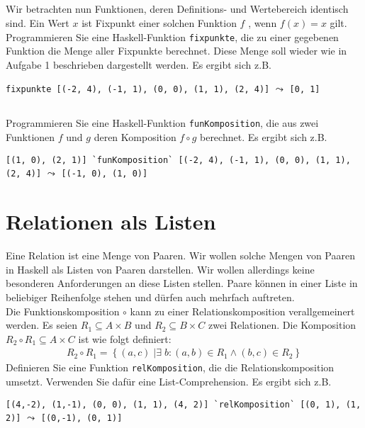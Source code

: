 \documentclass[
  10pt,                   %
  DIV12,
  german,                 %
  oneside,                %
  parskip=half,           %
  headings=normal,        %
  captions=tableheading,  %
]{scrartcl}
\begin{document}
\subsection{}
Wir betrachten nun Funktionen, deren Definitions- und Wertebereich identisch sind.
Ein Wert $x$ ist Fixpunkt einer solchen Funktion $f$ , wenn $f(x) = x$ gilt. Programmieren
Sie eine Haskell-Funktion \lstinline|fixpunkte|, die zu einer gegebenen Funktion die Menge
aller Fixpunkte berechnet. Diese Menge soll wieder wie in Aufgabe 1 beschrieben
dargestellt werden. Es ergibt sich z.B.
\begin{center}
\lstinline|fixpunkte [(-2, 4), (-1, 1), (0, 0), (1, 1), (2, 4)]| $\leadsto$ \lstinline|[0, 1]|
\end{center}
\subsection{}
Programmieren Sie eine Haskell-Funktion \lstinline|funKomposition|, die aus zwei Funktionen
$f$ und $g$ deren Komposition $f \circ g$ berechnet. Es ergibt sich z.B.
\begin{center}
\lstinline|[(1, 0), (2, 1)] `funKomposition` [(-2, 4), (-1, 1), (0, 0), (1, 1), (2, 4)]| $\leadsto$ \lstinline|[(-1, 0), (1, 0)]|
\end{center}

\section{Relationen als Listen}
Eine Relation ist eine Menge von Paaren. Wir wollen solche Mengen von Paaren in Haskell
als Listen von Paaren darstellen. Wir wollen allerdings keine besonderen Anforderungen
an diese Listen stellen. Paare können in einer Liste in beliebiger Reihenfolge stehen und
dürfen auch mehrfach auftreten.\\	

Die Funktionskomposition $\circ$ kann zu einer Relationskomposition verallgemeinert werden.
Es seien $R_1 \subseteq A \times B$ und $R_2 \subseteq B \times C$ zwei Relationen. Die Komposition $R_2 \circ R_1 \subseteq A \times C$
ist wie folgt definiert:
\begin{align*}
R_2 \circ R_1 = \left\{(a, c)\;| \exists\;b : (a, b) \in R_1 \wedge (b, c) \in R_2 \right\}
\end{align*}
Definieren Sie eine Funktion \lstinline|relKomposition|, die die Relationskomposition umsetzt.
Verwenden Sie dafür eine List-Comprehension. Es ergibt sich z.B.
\begin{center}
\lstinline|[(4,-2), (1,-1), (0, 0), (1, 1), (4, 2)] `relKomposition` [(0, 1), (1, 2)]| $\leadsto$ \lstinline|[(0,-1), (0, 1)]|
\end{center}
\end{document}
